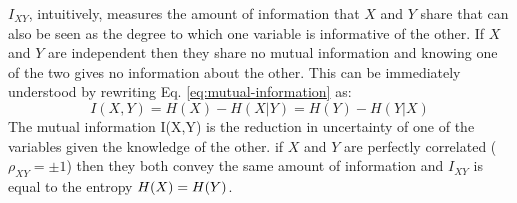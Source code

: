 $I_{XY}$, intuitively, measures the amount of information that $X$ and $Y$ share that can also be seen as the degree to which one variable is informative of the other.
If $X$ and $Y$ are independent then they share no mutual information and knowing one of the two gives no information about the other.
This can be immediately understood by rewriting Eq. \ref{eq:mutual-information} as:
\begin{equation}
	I(X,Y) = H(X) - H(X|Y) = H(Y) - H(Y|X)
\end{equation}
The mutual information I(X,Y) is the reduction in uncertainty of one of the variables given the knowledge of the other.
if $X$ and $Y$ are perfectly correlated ($\rho_{XY}= \pm 1$) then they both convey the same amount of information and $I_{XY}$ is equal to the entropy $H(X) = H(Y)$.